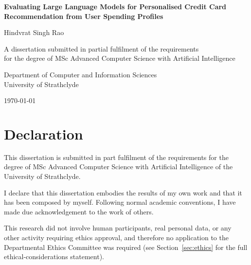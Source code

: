\begin{titlepage}
\centering
\vspace*{2cm}

{\LARGE \textbf{Evaluating Large Language Models for Personalised Credit Card Recommendation from User Spending Profiles}}

\vspace{2cm}

{\Large Hindvrat Singh Rao}

\vspace{1cm}

{\large A dissertation submitted in partial fulfilment of the requirements\\ for the degree of MSc Advanced Computer Science with Artificial Intelligence}

\vspace{2cm}

{\large Department of Computer and Information Sciences\\ University of Strathclyde}

\vspace{2cm}

{\large \today}

\vfill
\end{titlepage}

\chapter*{Declaration}

This dissertation is submitted in part fulfilment of the requirements for the degree of MSc Advanced Computer Science with Artificial Intelligence of the University of Strathclyde.

I declare that this dissertation embodies the results of my own work and that it has been composed by myself. Following normal academic conventions, I have made due acknowledgement to the work of others.

This research did not involve human participants, real personal data, or any other activity requiring ethics approval, and therefore no application to the Departmental Ethics Committee was required (see Section~\ref{sec:ethics} for the full ethical-considerations statement).

